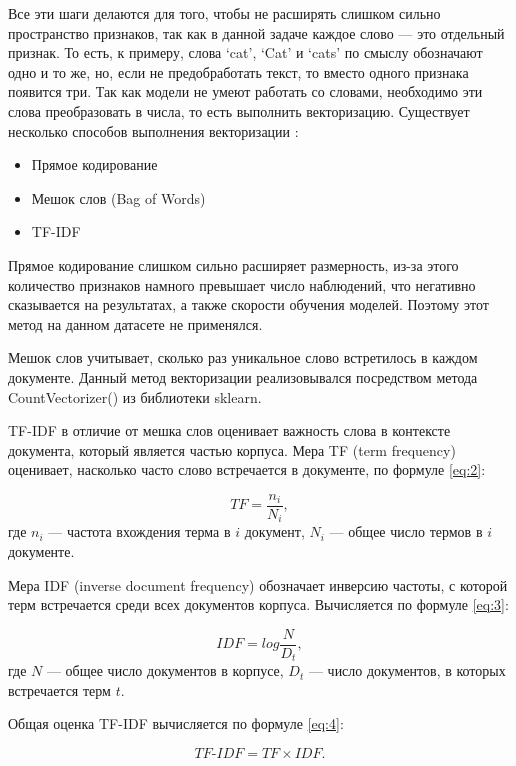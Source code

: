 \documentclass[14pt]{mmcs_article}
\begin{document}
Все эти шаги делаются для того, чтобы не расширять слишком сильно пространство признаков, так как в данной задаче каждое слово --- это отдельный признак. То есть, к примеру, слова `cat', `Cat' и `cats' по смыслу обозначают одно и то же, но, если не предобработать текст, то вместо одного признака появится три.
Так как модели не умеют работать со словами, необходимо эти слова преобразовать в числа, то есть выполнить векторизацию. Существует несколько способов выполнения векторизации \cite{lib:vect}:

\begin{itemize}
	\item Прямое кодирование
	\item Мешок слов (Bag of Words)
	\item TF-IDF 
\end{itemize}

Прямое кодирование слишком сильно расширяет размерность, из-за этого количество признаков намного превышает число наблюдений, что негативно сказывается на результатах, а также скорости обучения моделей. Поэтому этот метод на данном датасете не применялся.

Мешок слов учитывает, сколько раз уникальное слово встретилось в каждом документе. Данный метод векторизации реализовывался посредством метода CountVectorizer() из библиотеки sklearn.

TF-IDF \cite{lib:tfidf} в отличие от мешка слов оценивает важность слова в контексте документа, который является частью корпуса. Мера TF (term frequency) оценивает, насколько часто слово встречается в документе, по формуле \ref{eq:2}:

\begin{equation}\label{eq:2}
	TF = \frac{n_i}{N_i},
\end{equation}
где $n_i$ --- частота вхождения терма в $i$ документ, $N_i$ — общее число термов в $i$ документе.

Мера IDF (inverse document frequency) обозначает инверсию частоты, с которой терм встречается среди всех документов корпуса. Вычисляется по формуле \ref{eq:3}:

\begin{equation}\label{eq:3}
	IDF = log \frac{N}{D_t},
\end{equation}
где $N$ --- общее число документов в корпусе, $D_t$ --- число документов, в которых встречается терм $t$.

Общая оценка TF-IDF вычисляется по формуле \ref{eq:4}: 

\begin{equation}\label{eq:4}
	TF\text{-}IDF = TF \times IDF.
\end{equation}
\end{document}

